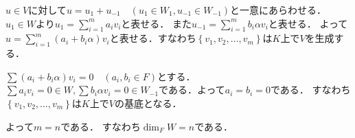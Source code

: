 \documentclass[
		book,
		head_space=20mm,
		foot_space=20mm,
		gutter=10mm,
		line_length=190mm
]{jlreq}
\begin{document}
$u\in V$に対して$u=u_1+u_{-1}\quad(u_1 \in W_1,u_{-1} \in W_{-1})$と一意にあらわせる．$u_1\in W$より$u_1=\sum_{i=1}^m a_i v_i$と表せる．
また$u_{-1}=\sum_{i=1}^m b_i \alpha v_i$と表せる．
よって$u=\sum_{i=1}^m (a_i+b_i \alpha)v_i$と表せる．すなわち$\left\{ v_1,v_2,\ldots,v_m \right\}$は$K$上で$V$を生成する．

$\sum (a_i+b_i \alpha) v_i=0\quad (a_i,b_i  \in F)$とする．
$\sum a_i v_i=0\in W,\sum b_i \alpha v_i=0 \in W_{-1}$である．よって$a_i=b_i=0$である．
すなわち$\left\{ v_1,v_2,\ldots,v_m \right\}$は$K$上で$V$の基底となる．

よって$m=n$である．
すなわち$\dim_F W=n$である．
\end{document}
